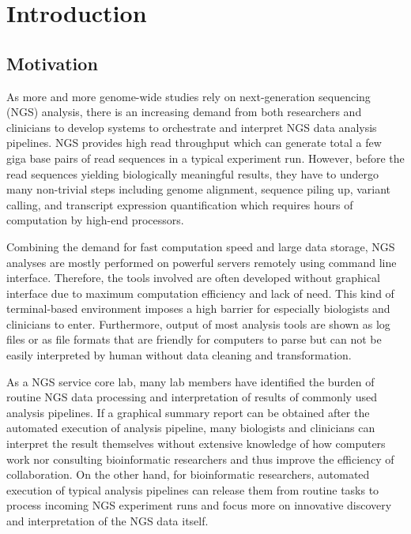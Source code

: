 \chapter{Introduction}
\label{c:intro}

\section{Motivation}
\label{s:motivation}

%
%

As more and more genome-wide studies rely on next-generation sequencing (NGS)
analysis, there is an increasing demand from both researchers and clinicians to
develop systems to orchestrate and interpret NGS data analysis pipelines. NGS
provides high read throughput which can generate total a few giga base pairs of
read sequences in a typical experiment run. However, before the read sequences
yielding biologically meaningful results, they have to undergo many non-trivial
steps including genome alignment, sequence piling up, variant calling, and
transcript expression quantification which requires hours of computation by
high-end processors.

Combining the demand for fast computation speed and large data storage, NGS
analyses are mostly performed on powerful servers remotely using command line
interface. Therefore, the tools involved are often developed without graphical
interface due to maximum computation efficiency and lack of need. This kind of
terminal-based environment imposes a high barrier for especially biologists and
clinicians to enter. Furthermore, output of most analysis tools are shown as
log files or as file formats that are friendly for computers to parse but can
not be easily interpreted by human without data cleaning and transformation.

As a NGS service core lab, many lab members have identified the burden of
routine NGS data processing and interpretation of results of commonly used
analysis pipelines. If a graphical summary report can be obtained after the
automated execution of analysis pipeline, many biologists and clinicians can
interpret the result themselves without extensive knowledge of how computers
work nor consulting bioinformatic researchers and thus improve the efficiency
of collaboration. On the other hand, for bioinformatic researchers, automated
execution of typical analysis pipelines can release them from routine tasks to
process incoming NGS experiment runs and focus more on innovative discovery and
interpretation of the NGS data itself.

